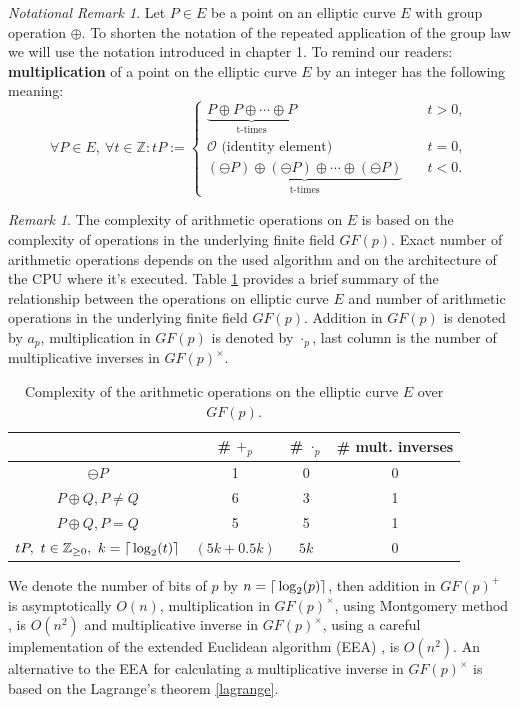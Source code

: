 \documentclass[thesis=M,english]{FITthesis}[2012/10/20]
\theoremstyle{remark}
\newtheorem*{RM}{Remark}
\newtheorem*{NRM}{Notational Remark}
\theoremstyle{definition}
\begin{document}
\begin{NRM}
Let $P \in E$ be a point on an elliptic curve $E$ with group operation $\oplus$. To shorten the notation of the repeated application of the group law we will use the notation introduced in chapter 1. To remind our readers: \textbf{multiplication} of a point on the elliptic curve $E$ by an integer has the following meaning:
$$
\forall P \in E,\ \forall t \in \mathbb{Z}: tP := \begin{cases} \underbrace{P \oplus P \oplus \cdots \oplus P}_{\text{t-times}} &\quad t > 0, \\
\mathcal{O} \text{ (identity element) } &\quad t = 0, \\
\underbrace{(\ominus P) \oplus (\ominus P) \oplus \cdots \oplus (\ominus P)}_{\text{t-times}} &\quad t < 0.
\end{cases}
$$
\end{NRM} 
\begin{RM}
The complexity of arithmetic operations on $E$ is based on the complexity of operations in the underlying finite field $GF(p)$.  Exact number of arithmetic operations depends on the used algorithm and on the architecture of the CPU where it's executed. Table \ref{tblComp} provides a brief summary of the relationship between the operations on elliptic curve $E$ and number of arithmetic operations in the underlying finite field $GF(p)$. Addition in $GF(p)$ is denoted by $a_p$, multiplication in $GF(p)$ is denoted by $\cdot_p$, last column is the number of multiplicative inverses in $GF(p)^{\times}$. 
\begin{table}[!h]
\centering
\begin{tabular}{ |c||c|c|c| } 
 \hline
 & \# $+_p$ & \# $\cdot_p$ & \# mult. inverses \\ 
 \hline
 \hline
$\ominus P$ & 1 & 0 & 0  \\  \hline
$P \oplus Q, P \neq Q$ & 6 & 3 & 1 \\  \hline
$P \oplus Q, P = Q$ & 5 & 5 & 1 \\  \hline
$tP,\ t \in \mathbb{Z}_{\geq 0},\ k = \mathlarger{\lceil} \log_2(t) \mathlarger{\rceil}$ & $ (5k + 0.5k)$\footnotemark & $5k$ & 0 \\ \hline
\end{tabular}
\caption{Complexity of the arithmetic operations on the elliptic curve $E$ over $GF(p)$.}
\label{tblComp}
\end{table}
\end{RM}
\noindent We denote the number of bits of $p$ by $n = \mathlarger{\lceil} \log_2(p) \mathlarger{\rceil}$, then addition in $GF(p)^{+}$ is asymptotically $O(n)$, multiplication in $GF(p)^{\times}$, using Montgomery method \cite{handbook}, is $O(n^2)$ and multiplicative inverse in $GF(p)^{\times}$, using a careful implementation of the extended Euclidean algorithm (EEA) \cite{handbook}, is $O(n^2)$. An alternative to the EEA for calculating a multiplicative inverse in $GF(p)^{\times}$ is based on the Lagrange's theorem \ref{lagrange}. 
\end{document}
